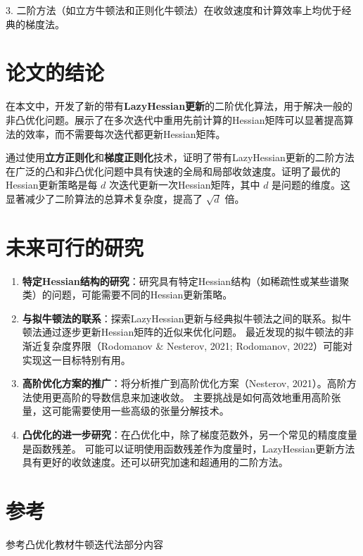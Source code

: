 \documentclass[a4paper,twoside,AutoFakeBold]{article}
\theoremstyle{definition}
\begin{document}
3. 二阶方法（如立方牛顿法和正则化牛顿法）在收敛速度和计算效率上均优于经典的梯度法。



\newpage

\section{论文的结论}

在本文中，开发了新的带有\textbf{LazyHessian更新}的二阶优化算法，用于解决一般的非凸优化问题。展示了在多次迭代中重用先前计算的Hessian矩阵可以显著提高算法的效率，而不需要每次迭代都更新Hessian矩阵。

通过使用\textbf{立方正则化}和\textbf{梯度正则化}技术，证明了带有LazyHessian更新的二阶方法在广泛的凸和非凸优化问题中具有快速的全局和局部收敛速度。证明了最优的Hessian更新策略是每 \(d\) 次迭代更新一次Hessian矩阵，其中 \(d\) 是问题的维度。这显著减少了二阶算法的总算术复杂度，提高了 \(\sqrt{d}\) 倍。

\section{未来可行的研究}
\begin{enumerate}
    \item \textbf{特定Hessian结构的研究}：研究具有特定Hessian结构（如稀疏性或某些谱聚类）的问题，可能需要不同的Hessian更新策略。
    \item \textbf{与拟牛顿法的联系}：探索LazyHessian更新与经典拟牛顿法之间的联系。拟牛顿法通过逐步更新Hessian矩阵的近似来优化问题。
    最近发现的拟牛顿法的非渐近复杂度界限（Rodomanov \& Nesterov, 2021; Rodomanov, 2022）可能对实现这一目标特别有用。
    \item \textbf{高阶优化方案的推广}：将分析推广到高阶优化方案（Nesterov, 2021）。高阶方法使用更高阶的导数信息来加速收敛。
	主要挑战是如何高效地重用高阶张量，这可能需要使用一些高级的张量分解技术。
    \item \textbf{凸优化的进一步研究}：在凸优化中，除了梯度范数外，另一个常见的精度度量是函数残差。
	可能可以证明使用函数残差作为度量时，LazyHessian更新方法具有更好的收敛速度。还可以研究加速和超通用的二阶方法。
\end{enumerate}
\newpage


\section{参考}\label{section:related}
参考凸优化教材牛顿迭代法部分内容\cite{nesterov2013introductory}
\end{document}
